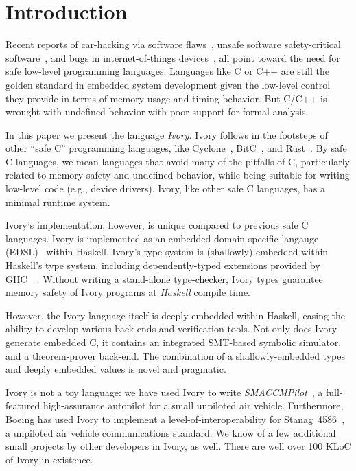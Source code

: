 \section{Introduction}
\label{sec:introduction}


Recent reports of car-hacking via software flaws~\cite{}, unsafe software
safety-critical software~\cite{}, and bugs in internet-of-things
devices~\cite{}, all point toward the need for safe low-level programming
languages. Languages like C or C++ are still the golden standard in embedded
system development given the low-level control they provide in terms of memory
usage and timing behavior. But C/C++ is wrought with undefined behavior with
poor support for formal analysis.

In this paper we present the language \emph{Ivory}.  Ivory follows in the
footsteps of other ``safe C'' programming languages, like
Cyclone~\cite{cyclone}, BitC~\cite{bitc}, and Rust~\cite{rust}. By safe C
languages, we mean languages that avoid many of the pitfalls of C, particularly
related to memory safety and undefined behavior, while being suitable for
writing low-level code (e.g., device drivers). Ivory, like other safe C
languages, has a minimal runtime system.

Ivory's implementation, however, is unique compared to previous safe C
languages. Ivory is implemented as an embedded domain-specific langauge
(EDSL)~\cite{edsl} within Haskell. Ivory's type system is (shallowly) embedded
within Haskell's type system, including dependently-typed extensions provided by
GHC~~\cite{dephaskell}. Without writing a stand-alone type-checker, Ivory types
guarantee memory safety of Ivory programs at \emph{Haskell} compile time.

However, the Ivory language itself is deeply embedded within Haskell, easing the
ability to develop various back-ends and verification tools. Not only does Ivory
generate embedded C, it contains an integrated SMT-based symbolic simulator, and
a theorem-prover back-end. The combination of a shallowly-embedded types and
deeply embedded values is novel and pragmatic.

Ivory is not a toy language: we have used Ivory to write
\emph{SMACCMPilot}~\cite{smaccm}, a full-featured high-assurance
autopilot for a small unpiloted air vehicle.  Furthermore, Boeing has
used Ivory to implement a level-of-interoperability for
Stanag~4586~\cite{stanag}, a unpiloted air vehicle communications
standard. We know of a few additional small projects by other
developers in Ivory, as well.  There are well over 100 KLoC of Ivory in existence.

